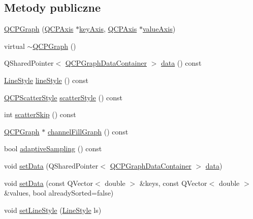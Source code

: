 \subsection*{Metody publiczne}
\begin{DoxyCompactItemize}
\item 
\hyperlink{class_q_c_p_graph_a0393a38cf7183cbf46348eb6cf9a5a6c}{Q\+C\+P\+Graph} (\hyperlink{class_q_c_p_axis}{Q\+C\+P\+Axis} $\ast$\hyperlink{class_q_c_p_abstract_plottable_a72c7a09c22963f2c943f07112b311103}{key\+Axis}, \hyperlink{class_q_c_p_axis}{Q\+C\+P\+Axis} $\ast$\hyperlink{class_q_c_p_abstract_plottable_a3106f9d34d330a6097a8ec5905e5b519}{value\+Axis})
\item 
virtual \hyperlink{class_q_c_p_graph_ae9998cfb9d379ac0ef3fbd6995cfbd76}{$\sim$\+Q\+C\+P\+Graph} ()
\item 
Q\+Shared\+Pointer$<$ \hyperlink{qcustomplot_8hh_a2e5583d1ae212f0deb10537cf975a15a}{Q\+C\+P\+Graph\+Data\+Container} $>$ \hyperlink{class_q_c_p_graph_a04514a2b1fb61a280ead66abe80b89ab}{data} () const 
\item 
\hyperlink{class_q_c_p_graph_ad60175cd9b5cac937c5ee685c32c0859}{Line\+Style} \hyperlink{class_q_c_p_graph_ad6db8d31abeac256a285fc68d6b9b9be}{line\+Style} () const 
\item 
\hyperlink{class_q_c_p_scatter_style}{Q\+C\+P\+Scatter\+Style} \hyperlink{class_q_c_p_graph_ae0227c79f4e42a350c2c99fb2fb879db}{scatter\+Style} () const 
\item 
int \hyperlink{class_q_c_p_graph_ae82c8427471bf68ccae960dfea6f30bd}{scatter\+Skip} () const 
\item 
\hyperlink{class_q_c_p_graph}{Q\+C\+P\+Graph} $\ast$ \hyperlink{class_q_c_p_graph_a5369f23863e04a6164f8b66d49fd18f4}{channel\+Fill\+Graph} () const 
\item 
bool \hyperlink{class_q_c_p_graph_ad3bea28ec910eedfa9b788928d610de0}{adaptive\+Sampling} () const 
\item 
void \hyperlink{class_q_c_p_graph_a1eae9429a316b008e2d99b2d65a54395}{set\+Data} (Q\+Shared\+Pointer$<$ \hyperlink{qcustomplot_8hh_a2e5583d1ae212f0deb10537cf975a15a}{Q\+C\+P\+Graph\+Data\+Container} $>$ \hyperlink{class_q_c_p_graph_a04514a2b1fb61a280ead66abe80b89ab}{data})
\item 
void \hyperlink{class_q_c_p_graph_a73578d786532132310a926c3cd529b29}{set\+Data} (const Q\+Vector$<$ double $>$ \&keys, const Q\+Vector$<$ double $>$ \&values, bool already\+Sorted=false)
\item 
void \hyperlink{class_q_c_p_graph_a513fecccff5b2a50ce53f665338c60ff}{set\+Line\+Style} (\hyperlink{class_q_c_p_graph_ad60175cd9b5cac937c5ee685c32c0859}{Line\+Style} ls)

\end{DoxyCompactItemize}
